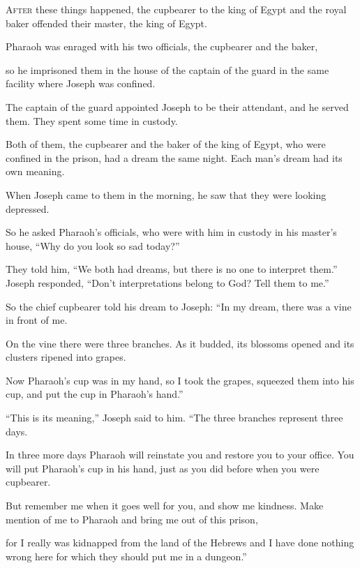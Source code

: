 \begin{scripture}
 \allowchapbreak\hypertarget{ch-genesis-40}{}\lettrine[lines=5]{\color{pentateuch}A}{\textsc{fter}} these things happened, the cupbearer to the king of Egypt and the royal baker offended their master, the king of Egypt.\everypar{}
 Pharaoh was enraged with his two officials, the cupbearer and the baker,
 so he imprisoned them in the house of the captain of the guard in the same facility where Joseph was confined.
\everypar{}

 The captain of the guard appointed Joseph to be their attendant, and he served them. They spent some time in custody.
 Both of them, the cupbearer and the baker of the king of Egypt, who were confined in the prison, had a dream the same night. Each man's dream had its own meaning.
 When Joseph came to them in the morning, he saw that they were looking depressed.
 So he asked Pharaoh's officials, who were with him in custody in his master's house, ``Why do you look so sad today?''
 They told him, ``We both had dreams, but there is no one to interpret them.'' Joseph responded, ``Don't interpretations belong to God? Tell them to me.''
\everypar{}

 So the chief cupbearer told his dream to Joseph: ``In my dream, there was a vine in front of me.
 On the vine there were three branches. As it budded, its blossoms opened and its clusters ripened into grapes.
 Now Pharaoh's cup was in my hand, so I took the grapes, squeezed them into his cup, and put the cup in Pharaoh's hand.''
\everypar{}

 ``This is its meaning,'' Joseph said to him. ``The three branches represent three days.
 In three more days Pharaoh will reinstate you and restore you to your office. You will put Pharaoh's cup in his hand, just as you did before when you were cupbearer.
 But remember me when it goes well for you, and show me kindness. Make mention of me to Pharaoh and bring me out of this prison,
 for I really was kidnapped from the land of the Hebrews and I have done nothing wrong here for which they should put me in a dungeon.''
\everypar{}


\end{scripture}
